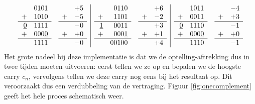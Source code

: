 \begin{equation}
\begin{array}{rl|rl|rl}
\begin{array}{rr}
&0101\\
+&1010\\\hline
\underline{0}&1111\\
+&000\underline{0}\\\hline
&1111
\end{array}
&
\begin{array}{rr}
&+5\\
+&-5\\\hline
&-0\\
+&+0\\\hline
&-0
\end{array}
&
\begin{array}{rr}
&0110\\
+&1101\\\hline
\underline{1}&0011\\
+&000\underline{1}\\\hline
&00100
\end{array}
&
\begin{array}{rr}
&+6\\
+&-2\\\hline
&+3\\
+&+1\\\hline
&+4
\end{array}
&
\begin{array}{rr}
&1011\\
+&0011\\\hline
\underline{0}&1110\\
+&000\underline{0}\\\hline
&1110
\end{array}
&
\begin{array}{rr}
&-4\\
+&+3\\\hline
&-1\\
+&+0\\\hline
&-1
\end{array}
\end{array}
\label{eqn:oneComplementCorrectExample}
\end{equation}
Het grote nadeel bij deze implementatie is dat we de optelling-aftrekking dus in twee tijden moeten uitvoeren: eerst tellen we ze op en bepalen we de hoogste carry $c_n$, vervolgens tellen we deze carry nog eens bij het resultaat op. Dit veroorzaakt dus een verdubbeling van de vertraging. Figuur \ref{fig:onecomplement} geeft het hele proces schematisch weer.
